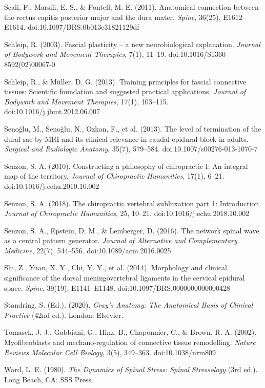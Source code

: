 \documentclass[11pt,letterpaper]{article}
\begin{document}
Scali, F., Marsili, E. S., \& Pontell, M. E. (2011). Anatomical connection between the rectus capitis posterior major and the dura mater. \textit{Spine}, 36(25), E1612–E1614. doi:10.1097/BRS.0b013e31821129df


Schleip, R. (2003). Fascial plasticity – a new neurobiological explanation. \textit{Journal of Bodywork and Movement Therapies}, 7(1), 11–19. doi:10.1016/S1360-8592(02)00067-0


Schleip, R., \& Müller, D. G. (2013). Training principles for fascial connective tissues: Scientific foundation and suggested practical applications. \textit{Journal of Bodywork and Movement Therapies}, 17(1), 103–115. doi:10.1016/j.jbmt.2012.06.007


Senoğlu, M., Senoğlu, N., Ozkan, F., et al. (2013). The level of termination of the dural sac by MRI and its clinical relevance in caudal epidural block in adults. \textit{Surgical and Radiologic Anatomy}, 35(7), 579–584. doi:10.1007/s00276-013-1070-7


Senzon, S. A. (2010). Constructing a philosophy of chiropractic I: An integral map of the territory. \textit{Journal of Chiropractic Humanities}, 17(1), 6–21. doi:10.1016/j.echu.2010.10.002


Senzon, S. A. (2018). The chiropractic vertebral subluxation part 1: Introduction. \textit{Journal of Chiropractic Humanities}, 25, 10–21. doi:10.1016/j.echu.2018.10.002


Senzon, S. A., Epstein, D. M., \& Lemberger, D. (2016). The network spinal wave as a central pattern generator. \textit{Journal of Alternative and Complementary Medicine}, 22(7), 544–556. doi:10.1089/acm.2016.0025


Shi, Z., Yuan, X. Y., Chi, Y. Y., et al. (2014). Morphology and clinical significance of the dorsal meningovertebral ligaments in the cervical epidural space. \textit{Spine}, 39(19), E1141–E1148. doi:10.1097/BRS.0000000000000428


Standring, S. (Ed.). (2020). \textit{Gray's Anatomy: The Anatomical Basis of Clinical Practice} (42nd ed.). London: Elsevier.


Tomasek, J. J., Gabbiani, G., Hinz, B., Chaponnier, C., \& Brown, R. A. (2002). Myofibroblasts and mechano-regulation of connective tissue remodelling. \textit{Nature Reviews Molecular Cell Biology}, 3(5), 349–363. doi:10.1038/nrm809


Ward, L. E. (1980). \textit{The Dynamics of Spinal Stress: Spinal Stressology} (3rd ed.). Long Beach, CA: SSS Press.
\end{document}
